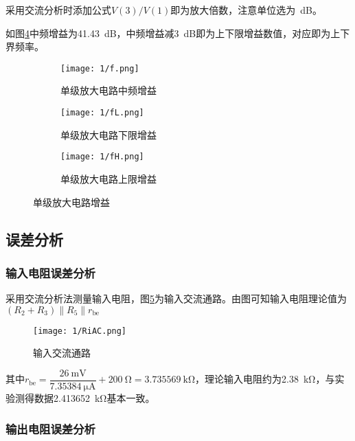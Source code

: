 采用交流分析时添加公式$ V(3)/V(1) $即为放大倍数，注意单位选为\SI{}{\dB}。

如图\ref{fig:单级放大电路增益}中频增益为\SI{41.43}{\dB}，中频增益减\SI{3}{\dB}即为上下限增益数值，对应即为上下界频率。

\begin{figure}[H]
	\centering
	\begin{subfigure}[H]{.8\linewidth}
		\centering
		\texttt{[image: 1/f.png]}
		\caption{单级放大电路中频增益}
		\label{fig:单级放大电路中频增益}
	\end{subfigure}
	\quad
	\begin{subfigure}[H]{.8\linewidth}
		\centering
		\texttt{[image: 1/fL.png]}
		\caption{单级放大电路下限增益}
		\label{fig:单级放大电路下限增益}
	\end{subfigure}
	\quad
	\begin{subfigure}[H]{.8\linewidth}
		\centering
		\texttt{[image: 1/fH.png]}
		\caption{单级放大电路上限增益}
		\label{fig:单级放大电路上限增益}
	\end{subfigure}
	\caption{单级放大电路增益}
	\label{fig:单级放大电路增益}
\end{figure}

\subsection{误差分析}%
\label{sub:\arabic{chapter}误差分析}

\subsubsection{输入电阻误差分析}%
\label{ssub:输入电阻误差分析}

采用交流分析法测量输入电阻，图\ref{fig:输入交流通路}为输入交流通路。由图可知输入电阻理论值为$ (R_2+R_3)\parallel R_5\parallel r_\mathrm{be} $

\begin{figure}[H]
	\centering
	\texttt{[image: 1/RiAC.png]}
	\caption{输入交流通路}
	\label{fig:输入交流通路}
\end{figure}

其中$ r_\mathrm{be} = \dfrac{\SI{26}{\mV}}{\SI{7.35384}{\uA}} + \SI{200}{\ohm} = \SI{3.735569}{\kohm} $，理论输入电阻约为\SI{2.38}{\kohm}，与实验测得数据\SI{2.413652}{\kohm}基本一致。

\subsubsection{输出电阻误差分析}%
\label{ssub:输出电阻误差分析}

